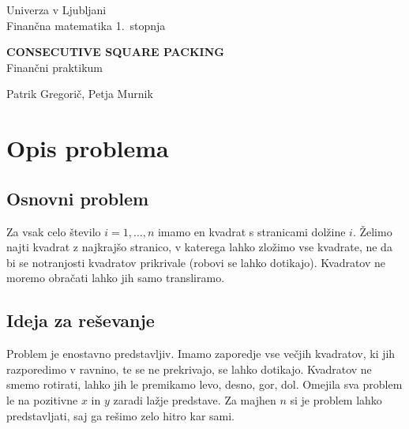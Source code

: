 \documentclass[a4paper, 11pt]{article}
\newcommand{\program}{Finančna matematika 1.~stopnja} %
\newcommand{\imeavtorja}{Patrik Gregorič, Petja Murnik} %
\newcommand{\naslovdela}{Consecutive square packing}
\newcommand{\letnica}{2022}
\newcommand{\predmet}{Finančni praktikum}
\begin{document}
\thispagestyle{empty}
\begin{center}
\begin{minipage}{0.75\linewidth}
    \centering
    {\Large Univerza v Ljubljani \\ \program}
    \\
    \vspace{3cm}

    {\uppercase{\Large \textbf{\naslovdela}}} \\ \predmet\\
    \vspace{3cm}

    {\Large \imeavtorja\par}
    \vspace{9cm}

\end{minipage}
\end{center}

\noindent{\large
Ljubljana, \letnica}
\pagebreak

\thispagestyle{empty}
\tableofcontents
\pagebreak


\section{Opis problema}

\subsection{Osnovni problem}
Za vsak celo število $i =1, \dots , n$ imamo en kvadrat s stranicami 
dolžine $i$. Želimo najti kvadrat z najkrajšo stranico, v katerega lahko 
zložimo vse kvadrate, ne da bi se notranjosti kvadratov prikrivale (robovi se lahko 
dotikajo). Kvadratov ne moremo obračati lahko jih samo transliramo.

\subsection{Ideja za reševanje}
Problem je enostavno predstavljiv. Imamo zaporedje vse večjih kvadratov, ki jih razporedimo
v ravnino, te se ne prekrivajo, se lahko dotikajo. Kvadratov ne smemo rotirati, lahko
jih le premikamo levo, desno, gor, dol. Omejila sva problem le na pozitivne $x$ in $y$
zaradi lažje predstave. Za majhen $n$ si je problem lahko predstavljati, saj ga
rešimo zelo hitro kar sami.
\end{document}
